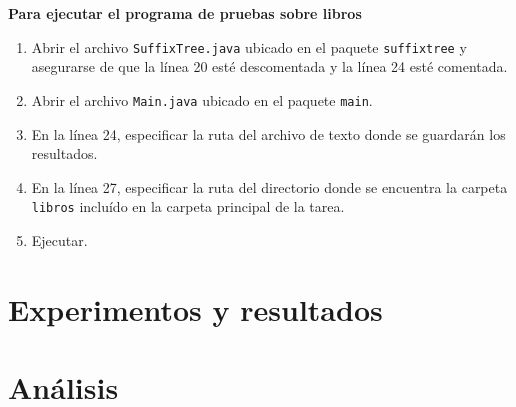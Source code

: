 \documentclass[14pt,letterpaper,hidelinks]{extarticle}
\begin{document}
\textbf{Para ejecutar el programa de pruebas sobre libros}
\begin{enumerate}
	\item Abrir el archivo \verb+SuffixTree.java+ ubicado en el paquete \verb+suffixtree+ y asegurarse de que la línea 20 esté descomentada y la línea 24 esté comentada.
	
	\item Abrir el archivo \verb+Main.java+ ubicado en el paquete \verb+main+.

	\item En la línea 24, especificar la ruta del archivo de texto donde se guardarán los resultados.

	\item En la línea 27, especificar la ruta del directorio donde se encuentra la carpeta \verb+libros+ incluído en la carpeta principal de la tarea.
	
	\item Ejecutar.

\end{enumerate}


\section{Experimentos y resultados}

  
\section{Análisis}


%
%
%

%
\end{document}
